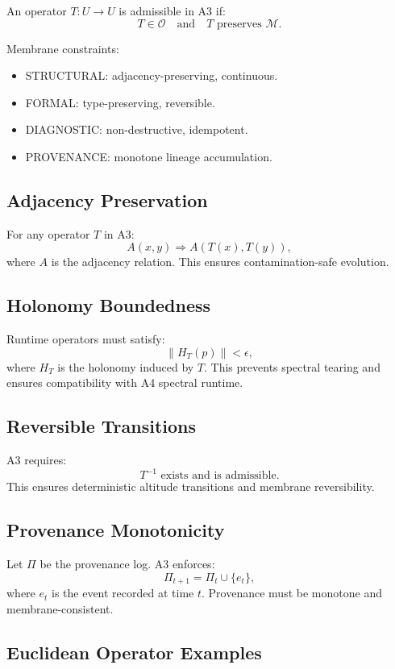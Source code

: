 An operator $T : U \rightarrow U$ is admissible in A3 if:
\[
T \in \mathcal{O} \quad \text{and} \quad T \text{ preserves } \mathcal{M}.
\]

Membrane constraints:
\begin{itemize}
  \item STRUCTURAL: adjacency-preserving, continuous.
  \item FORMAL: type-preserving, reversible.
  \item DIAGNOSTIC: non-destructive, idempotent.
  \item PROVENANCE: monotone lineage accumulation.
\end{itemize}

\subsection{Adjacency Preservation}

For any operator $T$ in A3:
\[
A(x,y) \Rightarrow A(T(x), T(y)),
\]
where $A$ is the adjacency relation. This ensures contamination-safe evolution.

\subsection{Holonomy Boundedness}

Runtime operators must satisfy:
\[
\| H_T(p) \| < \epsilon,
\]
where $H_T$ is the holonomy induced by $T$. This prevents spectral tearing and
ensures compatibility with A4 spectral runtime.

\subsection{Reversible Transitions}

A3 requires:
\[
T^{-1} \text{ exists and is admissible}.
\]
This ensures deterministic altitude transitions and membrane reversibility.

\subsection{Provenance Monotonicity}

Let $\Pi$ be the provenance log. A3 enforces:
\[
\Pi_{t+1} = \Pi_t \cup \{e_t\},
\]
where $e_t$ is the event recorded at time $t$. Provenance must be monotone and
membrane-consistent.

\subsection{Euclidean Operator Examples}

